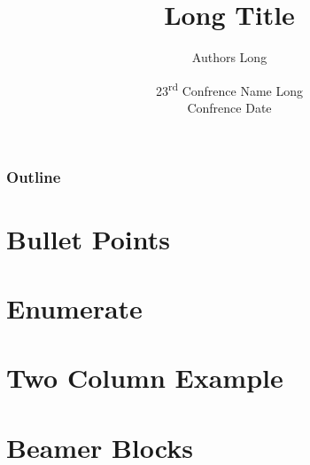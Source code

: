 \documentclass[aspectratio=\aspectratio]{beamer}
\title[Short Title]{Long Title}
\author[Authors Short]{Authors Long}
\institute[Research Group Short]
{
  Research Group Long \\
  Department \\
  Queen’s University, Canada
}
\date[Confrence Short]
{
  23\textsuperscript{rd} Confrence Name Long \\
  Confrence Date
}
\begin{document}
    \queensutitlepage

    \begin{frame}
        \frametitle{Outline}
        \tableofcontents
    \end{frame}

    \section{Bullet Points}
    

    \section{Enumerate}
    

    \section{Two Column Example}
    

    \section{Beamer Blocks}
    
\end{document}
